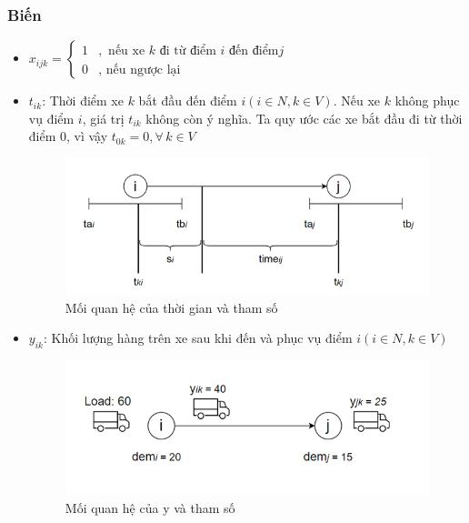 \documentclass[12pt,a4paper]{article}\author{Nguyễn Nho Dũng}
\begin{document}
\subsubsection*{Biến}
\begin{itemize}
	\item $x_{ijk} = \begin{cases}
		1 &,\text{ nếu xe } k \text{ đi từ điểm } i \text{ đến điểm} j\\
		0 &,\text{ nếu ngược lại} 
	\end{cases}$
	\item $t_{ik}$: Thời điểm xe $k$ bắt đầu đến điểm $i (i \in N, k \in V)$. Nếu xe $k$ không phục vụ điểm $i$, giá trị $t_{ik}$ không còn ý nghĩa. Ta quy ước các xe bắt đầu đi từ thời điểm $0$, vì vậy $t_{0k} = 0, \forall\, k \in V$
	\begin{figure}[H]
		\centering
		\includegraphics[width=\textwidth]{Anh/relationship_of_time_and_parameter}
		\caption{Mối quan hệ của thời gian và tham số}
		\label{relationship_of_time_and_parameter}
	\end{figure}
	\item $y_{ik}$: Khối lượng hàng trên xe sau khi đến và phục vụ điểm $i (i \in N, k\in V)$
	\begin{figure}[H]
		\centering
		\includegraphics[width=\textwidth]{Anh/relationship_of_y_and_others_parameter}
		\caption{Mối quan hệ của y và tham số}
		\label{relationship_of_y_and_others_parameter}
	\end{figure}
\end{itemize}
\end{document}
